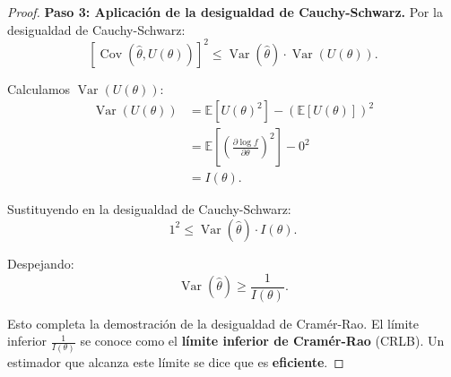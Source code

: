 \documentclass[11pt,a4paper]{article}
\theoremstyle{plain}
\theoremstyle{definition}
\begin{document}
\begin{proof}
\textbf{Paso 3: Aplicación de la desigualdad de Cauchy-Schwarz.}
Por la desigualdad de Cauchy-Schwarz:
\[
[\operatorname{Cov}(\hat{\theta}, U(\theta))]^2 \leq \operatorname{Var}(\hat{\theta}) \cdot \operatorname{Var}(U(\theta)).
\]

Calculamos $\operatorname{Var}(U(\theta))$:
\begin{align*}
\operatorname{Var}(U(\theta)) &= \mathbb{E}[U(\theta)^2] - (\mathbb{E}[U(\theta)])^2 \\
&= \mathbb{E}\left[\left(\frac{\partial \log f}{\partial \theta}\right)^2\right] - 0^2 \\
&= I(\theta).
\end{align*}

Sustituyendo en la desigualdad de Cauchy-Schwarz:
\[
1^2 \leq \operatorname{Var}(\hat{\theta}) \cdot I(\theta).
\]

Despejando:
\[
\operatorname{Var}(\hat{\theta}) \geq \frac{1}{I(\theta)}.
\]

Esto completa la demostración de la desigualdad de Cramér-Rao. El límite inferior $\frac{1}{I(\theta)}$ se conoce como el \textbf{límite inferior de Cramér-Rao} (CRLB). Un estimador que alcanza este límite se dice que es \textbf{eficiente}.
\end{proof}
\end{document}
